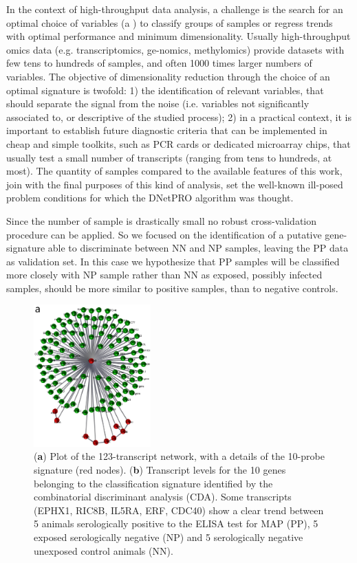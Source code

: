 \documentclass{standalone}
\begin{document}
In the context of high-throughput data analysis, a challenge is the search for an optimal choice of variables (a ) to classify groups of samples or regress trends with optimal performance and minimum dimensionality.
Usually high-throughput omics data (e.g. transcriptomics, ge-nomics, methylomics) provide datasets with few tens to hundreds of samples, and often 1000 times larger numbers of variables.
The objective of dimensionality reduction through the choice of an optimal signature is twofold: 1) the identification of relevant variables, that should separate the signal from the noise (i.e. variables not significantly associated to, or descriptive of the studied process); 2) in a practical context, it is important to establish future diagnostic criteria that can be implemented in cheap and simple toolkits, such as PCR cards or dedicated microarray chips, that usually test a small number of transcripts (ranging from tens to hundreds, at most).
The quantity of samples compared to the available features of this work, join with the final purposes of this kind of analysis, set the well-known ill-posed problem conditions for which the DNetPRO algorithm was thought.

Since the number of sample is drastically small no robust cross-validation procedure can be applied.
So we focused on the identification of a putative gene-signature able to discriminate between NN and NP samples, leaving the PP data as validation set.
In this case we hypothesize that PP samples will be classified more closely with NP sample rather than NN as exposed, possibly infected samples, should be more similar to positive samples, than to negative controls.

\begin{figure}[htbp]
\centering
\includegraphics[width=0.4\textwidth]{./img/Bovine_signature.png}
\qquad\qquad
\def\svgwidth{0.45\textwidth}

\caption[Caption Bovine]{(\textbf{a}) Plot of the 123-transcript network, with a details of the 10-probe signature (red nodes)\footnotemark.
(\textbf{b}) Transcript levels for the 10 genes belonging to the classification signature identified by the combinatorial discriminant analysis (CDA).
Some transcripts (EPHX1, RIC8B, IL5RA, ERF, CDC40) show a clear trend  between 5 animals serologically positive to the ELISA test for MAP (PP), 5 exposed serologically negative (NP) and 5 serologically negative unexposed control animals (NN).
}
\label{fig:bovine_signature}
\end{figure}
\end{document}
